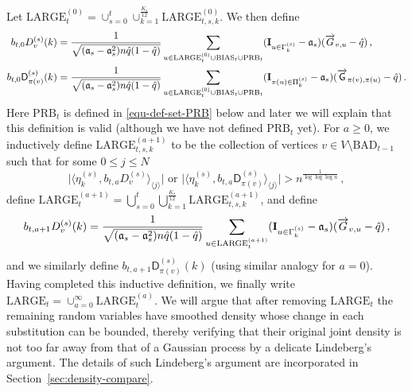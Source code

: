 \documentclass[11pt]{article}
\numberwithin{equation}{section}
\begin{document}
Let $\mathrm{LARGE}^{(0)}_t = \cup_{s=0}^{t} \cup_{k=1}^{\frac{K_s}{12}}\mathrm{LARGE}^{(0)}_{ t,s,k }$.
We then define
    \begin{align*}
    b_{t,0} {D}^{(s)}_v(k) &= \frac{1}{\sqrt{ ( \mathfrak{a}_s - \mathfrak{a}_s^2) n \Hat{q}(1-\Hat{q}) }} \sum_{ u \in \mathrm{LARGE}_{t}^{(0)} \cup \mathrm{BIAS}_t \cup \mathrm{PRB}_t } ( \mathbf{I}_{ u \in \Gamma^{(s)}_k } - \mathfrak{a}_s ) (\overrightarrow{G}_{v,u} - \Hat{q})\,,\\
    b_{t,0} {\mathsf D}^{(s)}_{\pi(v)}(k) &= \frac{1}{\sqrt{ ( \mathfrak{a}_s - \mathfrak{a}_s^2) n \Hat{q}(1-\Hat{q}) }} \sum_{ u \in \mathrm{LARGE}_{t}^{(0)} \cup \mathrm{BIAS}_t \cup \mathrm{PRB}_t } ( \mathbf{I}_{ \pi(u) \in \Pi^{(s)}_k } - \mathfrak{a}_s ) (\overrightarrow{\mathsf{G}}_{\pi(v),\pi(u)} - \Hat{q}) \,.
\end{align*}
Here $\mathrm{PRB}_t$ is defined in \eqref{equ-def-set-PRB} below and later we will explain that this definition is valid (although we have not defined $\mathrm{PRB}_t$ yet). 
For $a\geq 0$, we inductively define $\mathrm{LARGE}^{(a+1)}_{t,s,k} $ to be the collection of vertices $ v \in V \setminus \mathrm{BAD}_{t-1} $ such that  for some $0\leq j\leq N$
\begin{equation}
\big| \langle \eta^{(s)}_k , b_{t,a} {D}^{(s)}_v \rangle_{ \langle j \rangle } \big| \mbox{ or } \big| \langle \eta^{(s)}_k , b_{t,a} {\mathsf D}^{(s)}_{\pi(v)} \rangle_{ \langle j \rangle } \big|  > n^{ \frac{1} {\log \log \log n}}\,,  \label{equ-def-set-LARGE}
\end{equation}
define $\mathrm{LARGE}^{(a+1)}_t = \bigcup_{ s=0}^{ t } \bigcup_{k=1}^{\frac{K_s}{12}} \mathrm{LARGE}^{(a+1)}_{t,s,k }$, and define
\begin{align*}
    b_{t,a+1} {D}^{(s)}_v(k) = \frac{1}{\sqrt{ ( \mathfrak{a}_s - \mathfrak{a}_s^2) n \Hat{q}(1-\Hat{q}) }} \sum_{ u \in \mathrm{LARGE}^{(a+1)}_t } ( \mathbf{I}_{ u \in \Gamma^{(s)}_k } - \mathfrak{a}_s ) (\overrightarrow{G}_{v,u} - \Hat{q}) \,,
\end{align*}
and we similarly define $b_{t,a+1} {\mathsf D}^{(s)}_{\pi(v)}(k)$ (using similar analogy for $a=0$). 
Having completed this inductive definition, we finally write $\mathrm{LARGE}_{t} =  \cup_{a=0}^{\infty} \mathrm{LARGE}^{(a)}_t$. We will argue that after removing $\mathrm{LARGE}_t$ the remaining random variables have smoothed density whose change in each substitution can be bounded, thereby verifying that their original joint density is not too far away from that of a Gaussian process by a delicate Lindeberg's argument. The details of such Lindeberg's argument are incorporated in Section~\ref{sec:density-compare}. 
\end{document}
